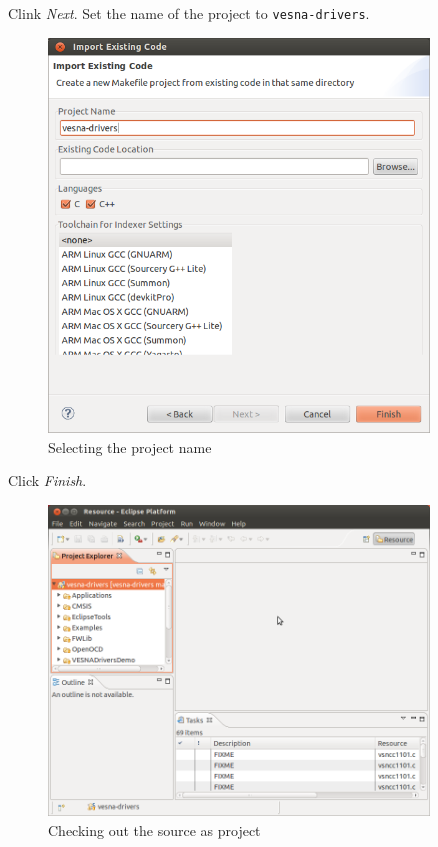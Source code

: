 \documentclass[a4paper, 10pt]{article}
\begin{document}
Clink \emph{Next}.
Set the name of the project to \verb+vesna-drivers+.

    \begin{figure}[H]
    \centering
        \includegraphics[width=0.9\textwidth]{./install-guide-linux-images/test-project-name.png}
        \caption{Selecting the project name}
        \label{fig:test-project-name}
    \end{figure}

Click \emph{Finish}.

    \begin{figure}[H]
    \centering
        \includegraphics[width=0.9\textwidth]{./install-guide-linux-images/test-got-project.png}
        \caption{Checking out the source as project}
        \label{fig:test-got-project}
    \end{figure}
\end{document}
